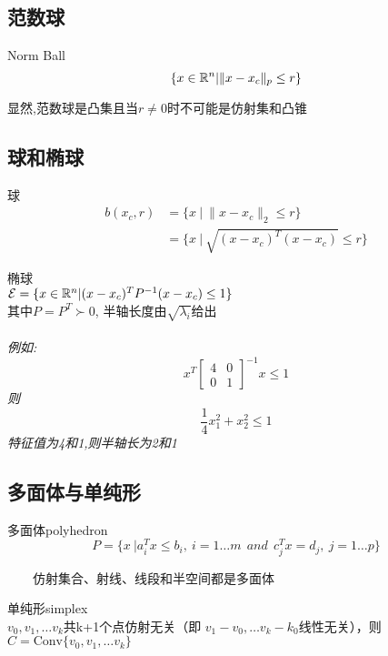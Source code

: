 \documentclass{mytemplate}
\begin{document}
\newpage
\subsection{范数球}

\begin{definition}{Norm Ball}
    \[\{x \in \mathbb{R}^n | \|x - x_c\|_p \leq r\}
    \]
\end{definition}
显然,范数球是凸集且当$r\neq0$时不可能是仿射集和凸锥

\subsection{球和椭球}
\begin{definition}{球}
    \begin{align}
        b(x_c, r) & =\{x\ |\ \|x-x_c\|_2 \leq r\}             \\
                  & =\{x\ |\ \sqrt{(x-x_c)^T (x-x_c)}\leq r\}
    \end{align}
\end{definition}
\begin{definition}{椭球}\\
    $\mathcal{E}=\{x \in \mathbb{R}^n | (x - x_c)^T P^{-1} (x-x_c) \leq 1\}$ \\
    其中$P=P^T \succ 0$, 半轴长度由$\sqrt{\lambda_i}$给出\\
    \\
    \emph{例如:\[
        x^T\begin{bmatrix}
            4 & 0 \\
            0 & 1
        \end{bmatrix}^{-1}x \leq 1
    \]
    则\[
        \frac{1}{4}x_1^2 + x_2^2 \leq 1
    \]
    特征值为4和1,则半轴长为2和1}
\end{definition}

\subsection{多面体与单纯形}
\begin{definition}{多面体polyhedron}
    \[
        P = \{
        x\ | a_i^T x \leq b_i,\ i = 1\dots m\ \ and\ \
        c_j^T x = d_j,\ j=1\dots p
        \}
    \]
\end{definition}
\ \ \ \ 仿射集合、射线、线段和半空间都是多面体

\begin{definition}{单纯形simplex}\\
    \(v_0,v_1, \dots v_k\)共k+1个点仿射无关（即
    \(v_1-v_0,\dots v_k-k_0\)线性无关），则$C=\text{Conv}\{v_0,v_1,\dots v_k\}$
\end{definition}
\end{document}
